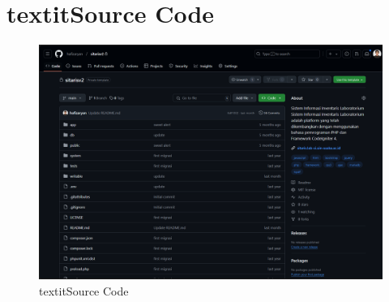 %
%
%
%


\renewcommand{\thepage}{D - \arabic{page}}
\chapter{textit{Source Code}}
\begin{figure}[h]
	\centering
	\includegraphics[width=0.82\linewidth]{konten/gambar/source-code.png}
	\caption{textit{Source Code}}
	\label{fig:source-code}
\end{figure}